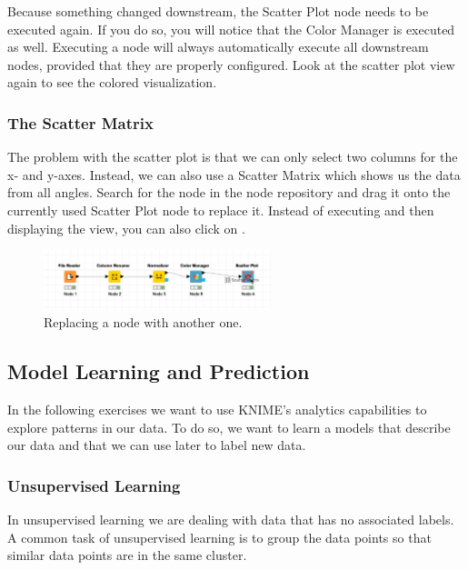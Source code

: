 Because something changed downstream, the Scatter Plot node needs to be executed again. If you do so, you will notice that the Color Manager is executed as well. Executing a node will always automatically execute all downstream nodes, provided that they are properly configured. Look at the scatter plot view again to see the colored visualization.

\subsubsection{The Scatter Matrix}

The problem with the scatter plot is that we can only select two columns for the x- and y-axes. Instead, we can also use a Scatter Matrix which shows us the data from all angles. Search for the node in the node repository and drag it onto the currently used Scatter Plot node to replace it. Instead of executing and then displaying the view, you can also click on .

\begin{figure}[h]
\centering
\includegraphics[width=0.59\textwidth]{graphics/knime_basics/replace_node}
\caption{Replacing a node with another one.}
\label{fig:replace_node}
\end{figure}


\subsection{Model Learning and Prediction}

In the following exercises we want to use KNIME's analytics capabilities to explore patterns in our data. To do so, we want to learn a models that describe our data and that we can use later to label new data.

\subsubsection{Unsupervised Learning}

In unsupervised learning we are dealing with data that has no associated labels. A common task of unsupervised learning is to group the data points so that similar data points are in the same cluster.


